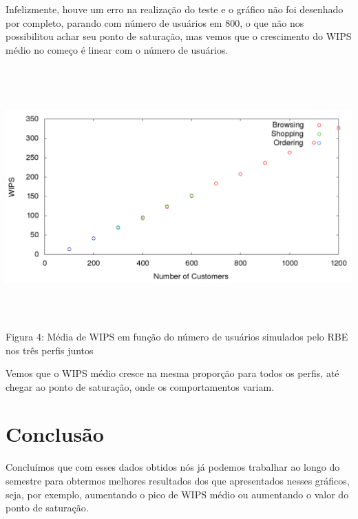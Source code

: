 \documentclass[11pt,twoside]{article}
\begin{document}
Infelizmente, houve um erro na realiza\c{c}\~ao do teste e o gr\'afico n\~ao foi desenhado por completo, parando com n\'umero de usu\'arios em 800, o que n\~ao nos possibilitou achar seu ponto de satura\c{c}\~ao, mas vemos que o crescimento do WIPS m\'edio no come\c{c}o \'e linear com o n\'umero de usu\'arios.

\begin{center}
\includegraphics[width=15cm, height=10cm]{images/plot_all}
Figura 4: M\'edia de WIPS em fun\c{c}\~ao do n\'umero de usu\'arios simulados pelo RBE nos tr\^es perfis juntos
\end{center}

Vemos que o WIPS m\'edio cresce na mesma propor\c{c}\~ao para todos os perfis, at\'e chegar ao ponto de satura\c{c}\~ao, onde os comportamentos variam.

\section{Conclus\~ao}
Conclu\'imos que com esses dados obtidos n\'os j\'a podemos trabalhar ao longo do semestre para obtermos melhores resultados dos que apresentados nesses gr\'aficos, seja, por exemplo, aumentando o pico de WIPS m\'edio ou aumentando o valor do ponto de satura\c{c}\~ao.
\end{document}
